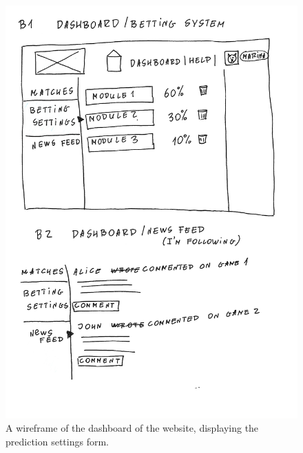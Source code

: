 \begin{figure}[H]
	\begin{center}
		\includegraphics[width=.90\textwidth]{design/images/B1.jpg}
		\caption{A wireframe of the dashboard of the website, displaying the prediction settings form.} \label{fig:using:wireframe_b1}
	\end{center}
\end{figure}

